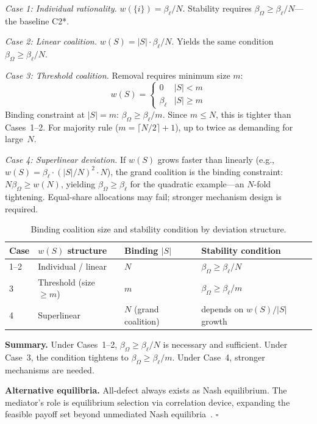 \documentclass[11pt]{article}
\begin{document}
\emph{Case 1: Individual rationality.} $w(\{i\}) = \beta_\ell / N$. Stability requires $\beta_\Omega \geq \beta_\ell / N$---the baseline C2*.

\emph{Case 2: Linear coalition.} $w(S) = |S| \cdot \beta_\ell / N$. Yields the same condition $\beta_\Omega \geq \beta_\ell / N$.

\emph{Case 3: Threshold coalition.} Removal requires minimum size $m$:
\begin{equation}
w(S) = \begin{cases} 0 & |S| < m \\ \beta_\ell & |S| \geq m \end{cases}
\end{equation}
Binding constraint at $|S| = m$: $\beta_\Omega \geq \beta_\ell/m$. Since $m \leq N$, this is tighter than Cases~1--2. For majority rule ($m = \lceil N/2 \rceil + 1$), up to twice as demanding for large~$N$.

\emph{Case 4: Superlinear deviation.} If $w(S)$ grows faster than linearly (e.g., $w(S) = \beta_\ell \cdot (|S|/N)^2 \cdot N$), the grand coalition is the binding constraint: $N \beta_\Omega \geq w(N)$, yielding $\beta_\Omega \geq \beta_\ell$ for the quadratic example---an $N$-fold tightening. Equal-share allocations may fail; stronger mechanism design is required.

\begin{table}[h]
\caption{Binding coalition size and stability condition by deviation structure.}
\label{tab:binding_coalition}
\centering
\small
\begin{tabular}{llll}
\toprule
\textbf{Case} & $w(S)$ \textbf{structure} & \textbf{Binding} $|S|$ & \textbf{Stability condition} \\
\midrule
1--2 & Individual / linear & $N$ & $\beta_\Omega \geq \beta_\ell / N$ \\
3 & Threshold (size $\geq m$) & $m$ & $\beta_\Omega \geq \beta_\ell / m$ \\
4 & Superlinear & $N$ (grand coalition) & depends on $w(S)/|S|$ growth \\
\bottomrule
\end{tabular}
\end{table}

\textbf{Summary.} Under Cases~1--2, $\beta_\Omega \geq \beta_\ell / N$ is necessary and sufficient. Under Case~3, the condition tightens to $\beta_\Omega \geq \beta_\ell / m$. Under Case~4, stronger mechanisms are needed.

\textbf{Alternative equilibria.} All-defect always exists as Nash equilibrium. The mediator's role is equilibrium selection via correlation device, expanding the feasible payoff set beyond unmediated Nash equilibria~\cite{aumann.1974,aumann.1987}. \hfill$\square$
\end{document}
